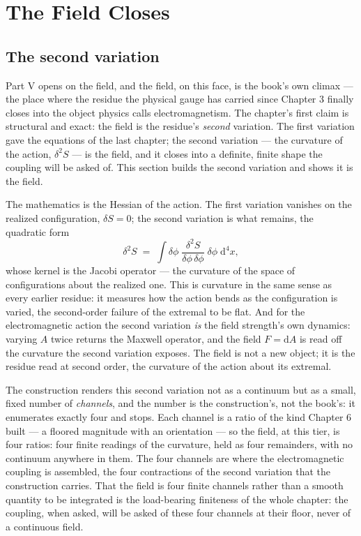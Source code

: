 \chapter{The Field Closes}

\section{The second variation}

Part V opens on the field, and the field, on this face, is the book's own climax --- the place where the residue the physical
gauge has carried since Chapter 3 finally closes into the object physics calls electromagnetism. The chapter's first claim is
structural and exact: the field is the residue's \emph{second} variation. The first variation gave the equations of the last
chapter; the second variation --- the curvature of the action, $\delta^2 S$ --- is the field, and it closes into a definite,
finite shape the coupling will be asked of. This section builds the second variation and shows it is the field.

The mathematics is the Hessian of the action. The first variation vanishes on the realized configuration, $\delta S = 0$;
the second variation is what remains, the quadratic form
\[
  \delta^2 S \;=\; \int \delta\phi \;\frac{\delta^2 S}{\delta\phi\,\delta\phi}\; \delta\phi \;\mathrm{d}^4x ,
\]
whose kernel is the Jacobi operator --- the curvature of the space of configurations about the realized one. This is
curvature in the same sense as every earlier residue: it measures how the action bends as the configuration is varied, the
second-order failure of the extremal to be flat. And for the electromagnetic action the second variation \emph{is} the field
strength's own dynamics: varying $A$ twice returns the Maxwell operator, and the field $F = \mathrm{d}A$ is read off the
curvature the second variation exposes. The field is not a new object; it is the residue read at second order, the curvature
of the action about its extremal.

The construction renders this second variation not as a continuum but as a small, fixed number of \emph{channels}, and the
number is the construction's, not the book's: it enumerates exactly four and stops. Each channel is a ratio of the kind
Chapter 6 built --- a floored magnitude with an orientation --- so the field, at this tier, is four ratios: four finite
readings of the curvature, held as four remainders, with no continuum anywhere in them. The four channels are where the
electromagnetic coupling is assembled, the four contractions of the second variation that the construction carries. That the
field is four finite channels rather than a smooth quantity to be integrated is the load-bearing finiteness of the whole
chapter: the coupling, when asked, will be asked of these four channels at their floor, never of a continuous field.


